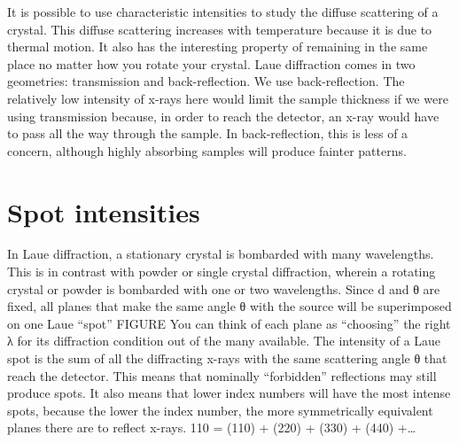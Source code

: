It is possible to use characteristic intensities to study the diffuse scattering of a crystal. This diffuse scattering increases with temperature because it is due to thermal motion. It also has the interesting property of remaining in the same place no matter how you rotate your crystal.
Laue diffraction comes in two geometries: transmission and back-reflection. We use back-reflection. The relatively low intensity of x-rays here would limit the sample thickness if we were using transmission because, in order to reach the detector, an x-ray would have to pass all the way through the sample. In back-reflection, this is less of a concern, although highly absorbing samples will produce fainter patterns.

\section{Spot intensities}
In Laue diffraction, a stationary crystal is bombarded with many wavelengths. This is in contrast with powder or single crystal diffraction, wherein a rotating crystal or powder is bombarded with one or two wavelengths. Since d and θ are fixed, all planes that make the same angle θ with the source will be superimposed on one Laue “spot” FIGURE
You can think of each plane as “choosing” the right λ for its diffraction condition out of the many available. The intensity of a Laue spot is the sum of all the diffracting x-rays with the same scattering angle θ that reach the detector.
This means that nominally “forbidden” reflections may still produce spots.
It also means that lower index numbers will have the most intense spots, because the lower the index number, the more symmetrically equivalent planes there are to reflect x-rays.
{110} = (110) + (220) + (330) + (440) +…
